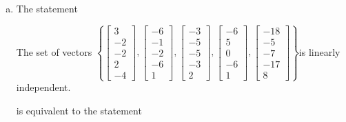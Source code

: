 \begin{exerciseAnswer}
\begin{enumerate}[(a)]
\item The statement 
\begin{center}\begin{minipage}{0.8\textwidth}
 The set of vectors \( \left\{ \left[\begin{array}{c}
3 \\
-2 \\
-2 \\
2 \\
-4
\end{array}\right] , \left[\begin{array}{c}
-6 \\
-1 \\
-2 \\
-6 \\
1
\end{array}\right] , \left[\begin{array}{c}
-3 \\
-5 \\
-5 \\
-3 \\
2
\end{array}\right] , \left[\begin{array}{c}
-6 \\
5 \\
0 \\
-6 \\
1
\end{array}\right] , \left[\begin{array}{c}
-18 \\
-5 \\
-7 \\
-17 \\
8
\end{array}\right] \right\} \)is linearly independent.
\end{minipage}\end{center}
     is equivalent to the statement 
\begin{center}\begin{minipage}{0.8\textwidth}
 The vector equation \( x_{1} \left[\begin{array}{c}
3 \\
-2 \\
-2 \\
2 \\
-4
\end{array}\right] + x_{2} \left[\begin{array}{c}
-6 \\
-1 \\

\end{array}
\end{minipage}
\end{center}
\end{enumerate}
\end{exerciseAnswer}
